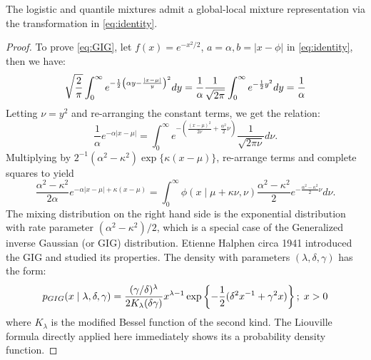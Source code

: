 \documentclass[letterpaper,11pt]{article}
\begin{document}
\begin{lemma}
The logistic and quantile mixtures admit a global-local mixture representation via the \CS transformation in \eqref{eq:identity}. 
\end{lemma}
\begin{proof}
To prove \eqref{eq:GIG}, let $f(x) = e^{-x^2/2}$, $a = \alpha, b = |x-\phi|$ in \eqref{eq:identity}, then we have: 
$$
\sqrt{\frac{2}{\pi}} \int_{0}^{\infty} e^{-\frac{1}{2} \left(\alpha y - \frac{|x-\mu|}{y} \right)^2} dy = \frac{1}{\alpha}\frac{1}{\sqrt{2\pi}} \int_0^{\infty} e^{-\frac{1}{2} y^2} dy = \frac{1}{\alpha}
$$
Letting $\nu = y^2$ and re-arranging the constant terms, we get the relation:
$$
\frac{1}{\alpha} e^{-\alpha|x-\mu|} = \int_{0}^{\infty} e^{-\left( \frac{(x-\mu)^2}{2\nu} + \frac{\alpha^2}{2} \nu \right)} \frac{1}{\sqrt{2\pi\nu}} d\nu.
$$
Multiplying by $2^{-1}(\alpha^2-\kappa^2) \exp\{\kappa(x-\mu)\}$, re-arrange terms and complete squares to yield 
\begin{equation*}
  \frac{\alpha^2-\kappa^2}{2\alpha} e^{-\alpha|x-\mu| + \kappa(x-\mu)} = \int_0^{\infty} \phi(x \mid \mu + \kappa \nu, \nu) \frac{\alpha^2-\kappa^2}{2} e^{-\frac{\alpha^2-\kappa^2}{2} \nu} d \nu. 
\end{equation*}
The mixing distribution on the right hand side is the exponential distribution with rate parameter $(\alpha^2-\kappa^2)/2$, which is a special case of the Generalized inverse Gaussian (or GIG) distribution. Etienne Halphen circa 1941 \citep{seshadri1997halphen} introduced the GIG and \citet{barndorff1977infinite} studied its properties. The density with parameters $(\lambda, \delta, \gamma)$ has the form: 
$$
p_{GIG}(x \mid \lambda, \delta, \gamma) = \frac{(\gamma/\delta)^{\lambda}}{2K_{\lambda}(\delta \gamma)} x^{\lambda-1} \exp \left\{ -\frac{1}{2} (\delta^2 x^{-1} + 
\gamma^2 x )  \right\}; \; x > 0
$$
where $K_{\lambda}$ is the modified Bessel function of the second kind. The Liouville formula directly applied here immediately shows its a probability density function. 


\end{proof}
\end{document}
